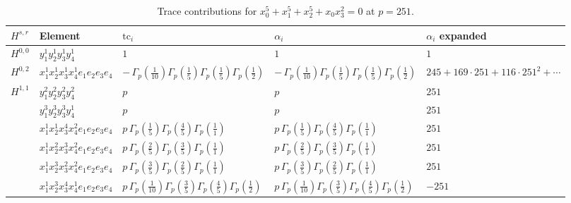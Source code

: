 \documentclass[11pt]{article}
\begin{document}
\begin{table}[ht]
\centering
\caption{Trace contributions for $x_0^{5} + x_1^{5} + x_2^{5} + x_0 x_3^{2} = 0$ at $p=251$.}\label{tab:deformed-2}
\renewcommand{\arraystretch}{1.1}
{\scriptsize
\begin{tabular}{@{}lllll@{}}
\toprule
$H^{s,r}$ & Element & $\mathrm{tc}_i$ & $\alpha_i$ & $\alpha_i$ expanded \\
\midrule
$H^{0,0}$ & $y_{1}^{1} y_{2}^{1} y_{3}^{1} y_{4}^{1}$ & $1$ & $1$ & $1$ \\
\midrule
$H^{0,2}$ & $x_{1}^{1} x_{2}^{1} x_{3}^{1} x_{4}^{1}  e_{1} e_{2} e_{3} e_{4}$ & $- \, \Gamma_p \left( \frac{1}{10} \right) \Gamma_p \left( \frac{1}{5} \right) \Gamma_p \left( \frac{1}{5} \right) \Gamma_p \left( \frac{1}{2} \right)$ & $- \, \Gamma_p \left( \frac{1}{10} \right) \Gamma_p \left( \frac{1}{5} \right) \Gamma_p \left( \frac{1}{5} \right) \Gamma_p \left( \frac{1}{2} \right)$ & $245{+}169{\cdot}251{+}116{\cdot}251^{2}{+}\cdots$ \\
\midrule
$H^{1,1}$ & $y_{1}^{2} y_{2}^{2} y_{3}^{2} y_{4}^{2}$ & $p \,$ & $p \,$ & $251$ \\
 & $y_{1}^{3} y_{2}^{3} y_{3}^{3} y_{4}^{1}$ & $p \,$ & $p \,$ & $251$ \\
 & $x_{1}^{1} x_{2}^{1} x_{3}^{4} x_{4}^{2}  e_{1} e_{2} e_{3} e_{4}$ & $p \, \Gamma_p \left( \frac{1}{5} \right) \Gamma_p \left( \frac{4}{5} \right) \Gamma_p \left( \frac{1}{1} \right)$ & $p \, \Gamma_p \left( \frac{1}{5} \right) \Gamma_p \left( \frac{4}{5} \right) \Gamma_p \left( \frac{1}{1} \right)$ & $251$ \\
 & $x_{1}^{1} x_{2}^{2} x_{3}^{3} x_{4}^{2}  e_{1} e_{2} e_{3} e_{4}$ & $p \, \Gamma_p \left( \frac{2}{5} \right) \Gamma_p \left( \frac{3}{5} \right) \Gamma_p \left( \frac{1}{1} \right)$ & $p \, \Gamma_p \left( \frac{2}{5} \right) \Gamma_p \left( \frac{3}{5} \right) \Gamma_p \left( \frac{1}{1} \right)$ & $251$ \\
 & $x_{1}^{1} x_{2}^{3} x_{3}^{2} x_{4}^{2}  e_{1} e_{2} e_{3} e_{4}$ & $p \, \Gamma_p \left( \frac{3}{5} \right) \Gamma_p \left( \frac{2}{5} \right) \Gamma_p \left( \frac{1}{1} \right)$ & $p \, \Gamma_p \left( \frac{3}{5} \right) \Gamma_p \left( \frac{2}{5} \right) \Gamma_p \left( \frac{1}{1} \right)$ & $251$ \\
 & $x_{1}^{1} x_{2}^{3} x_{3}^{4} x_{4}^{1}  e_{1} e_{2} e_{3} e_{4}$ & $p \, \Gamma_p \left( \frac{1}{10} \right) \Gamma_p \left( \frac{3}{5} \right) \Gamma_p \left( \frac{4}{5} \right) \Gamma_p \left( \frac{1}{2} \right)$ & $p \, \Gamma_p \left( \frac{1}{10} \right) \Gamma_p \left( \frac{3}{5} \right) \Gamma_p \left( \frac{4}{5} \right) \Gamma_p \left( \frac{1}{2} \right)$ & $-251$ \\

\end{tabular}}
\end{table}
\end{document}
